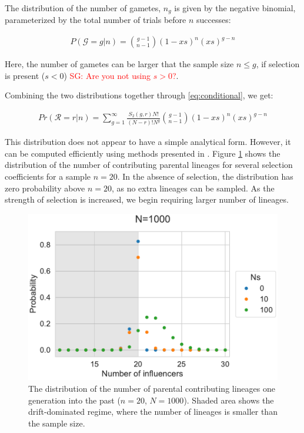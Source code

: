 \documentclass[review]{elsarticle}
\newcommand{\sgcomment}[1]{\textcolor{red}{SG: #1}}
\begin{document}
The distribution of the number of gametes, $n_g$ is given by the negative binomial, parameterized by
the total number of trials before $n$ successes:

\begin{align}
  \label{eq:neg-binomial-trials}
  P(\mathcal{G}=g|n) = \binom{g-1}{n-1}(1-xs)^n(xs)^{g-n}
\end{align}

Here, the number of gametes can be larger that the sample size $n \le g$, if selection is present
($s<0$) \sgcomment{Are you not using $s>0$?}.


Combining the two distributions together through \ref{eq:conditional}, we get:

\begin{align}
  \label{eq:lineages-in-past}
   Pr(\mathcal{R}=r|n) = \sum_{g=1}^{\infty} \frac{S_2(g,r) N!}{(N-r)! N^g} \binom{g-1}{n-1}(1-xs)^n(xs)^{g-n}
\end{align}

This distribution does not appear to have a simple analytical form. However, it can be computed
efficiently using methods presented in \citep{ONeill2019}. Figure \ref{fig:sampling-dist} shows the
distribution of the number of contributing parental lineages for several selection coefficients for
a sample $n=20$. In the absence of selection, the distribution has zero probability above $n=20$, as
no extra lineages can be sampled. As the strength of selection is increased, we begin requiring
larger number of lineages.

\begin{figure}
  \centering
  \includegraphics[]{fig/sampling-dist.pdf}
  \caption{The distribution of the number of parental contributing lineages one generation into the
    past ($n=20$, $N=1000$). Shaded area shows the drift-dominated regime, where the number of
    lineages is smaller than the sample size.}
  \label{fig:sampling-dist}
\end{figure}
\end{document}
